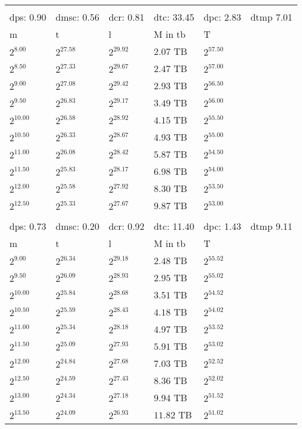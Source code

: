 \begin{tabular}{llllll}
 &  &  &  &  &  \\
dps: 0.90 & dmsc: 0.56 & dcr: 0.81 & dtc: 33.45 & dpc: 2.83 & dtmp 7.01 \\
m & t & l & M in tb & T \\
$2^{8.00}$ & $2^{27.58}$ & $2^{29.92}$ & $2.07$ TB & $2^{57.50}$ \\
$2^{8.50}$ & $2^{27.33}$ & $2^{29.67}$ & $2.47$ TB & $2^{57.00}$ \\
$2^{9.00}$ & $2^{27.08}$ & $2^{29.42}$ & $2.93$ TB & $2^{56.50}$ \\
$2^{9.50}$ & $2^{26.83}$ & $2^{29.17}$ & $3.49$ TB & $2^{56.00}$ \\
$2^{10.00}$ & $2^{26.58}$ & $2^{28.92}$ & $4.15$ TB & $2^{55.50}$ \\
$2^{10.50}$ & $2^{26.33}$ & $2^{28.67}$ & $4.93$ TB & $2^{55.00}$ \\
$2^{11.00}$ & $2^{26.08}$ & $2^{28.42}$ & $5.87$ TB & $2^{54.50}$ \\
$2^{11.50}$ & $2^{25.83}$ & $2^{28.17}$ & $6.98$ TB & $2^{54.00}$ \\
$2^{12.00}$ & $2^{25.58}$ & $2^{27.92}$ & $8.30$ TB & $2^{53.50}$ \\
$2^{12.50}$ & $2^{25.33}$ & $2^{27.67}$ & $9.87$ TB & $2^{53.00}$ \\
 &  &  &  &  &  \\
dps: 0.73 & dmsc: 0.20 & dcr: 0.92 & dtc: 11.40 & dpc: 1.43 & dtmp 9.11 \\
m & t & l & M in tb & T \\
$2^{9.00}$ & $2^{26.34}$ & $2^{29.18}$ & $2.48$ TB & $2^{55.52}$ \\
$2^{9.50}$ & $2^{26.09}$ & $2^{28.93}$ & $2.95$ TB & $2^{55.02}$ \\
$2^{10.00}$ & $2^{25.84}$ & $2^{28.68}$ & $3.51$ TB & $2^{54.52}$ \\
$2^{10.50}$ & $2^{25.59}$ & $2^{28.43}$ & $4.18$ TB & $2^{54.02}$ \\
$2^{11.00}$ & $2^{25.34}$ & $2^{28.18}$ & $4.97$ TB & $2^{53.52}$ \\
$2^{11.50}$ & $2^{25.09}$ & $2^{27.93}$ & $5.91$ TB & $2^{53.02}$ \\
$2^{12.00}$ & $2^{24.84}$ & $2^{27.68}$ & $7.03$ TB & $2^{52.52}$ \\
$2^{12.50}$ & $2^{24.59}$ & $2^{27.43}$ & $8.36$ TB & $2^{52.02}$ \\
$2^{13.00}$ & $2^{24.34}$ & $2^{27.18}$ & $9.94$ TB & $2^{51.52}$ \\
$2^{13.50}$ & $2^{24.09}$ & $2^{26.93}$ & $11.82$ TB & $2^{51.02}$ \\

\end{tabular}
